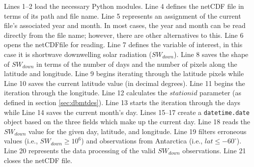 \noindent Lines 1--2 load the necessary Python modules.  
Line 4 defines the netCDF file in terms of its path and file name.  
Line 5 represents an assignment of the current file's associated year and month.  
In most cases, the year and month can be read directly from the file name; however, there are other alternatives to this.  
Line 6 opens the netCDFfile for reading.  
Line 7 defines the variable of interest, in this case it is shortwave downwelling solar radiation ($SW_{down}$).  
Line 8 saves the shape of $SW_{down}$ in terms of the number of days and the number of pixels along the latitude and longitude.  
Line 9 begins iterating through the latitude pixels while Line 10 saves the current latitude value (in decimal degrees).  
Line 11 begins the iteration through the longitude.  
Line 12 calculates the $stationid$ parameter (as defined in section \ref{sec:dbmtdes}). 
Line 13 starts the iteration through the days while Line 14  saves the current month's day.  
Lines 15--17 create a \texttt{datetime.date} object based on the three fields which make up the current day.  
Line 18 reads the $SW_{down}$ value for the given day, latitude, and longitude.  
Line 19 filters erroneous values (i.e., $SW_{down} \geq 10^{6}$) and observations from Antarctica (i.e., $lat \leq -60^{\circ}$).  
Line 20 represents the data processing of the valid $SW_{down}$ observations.  
Line 21 closes the netCDF file.

\newpage


